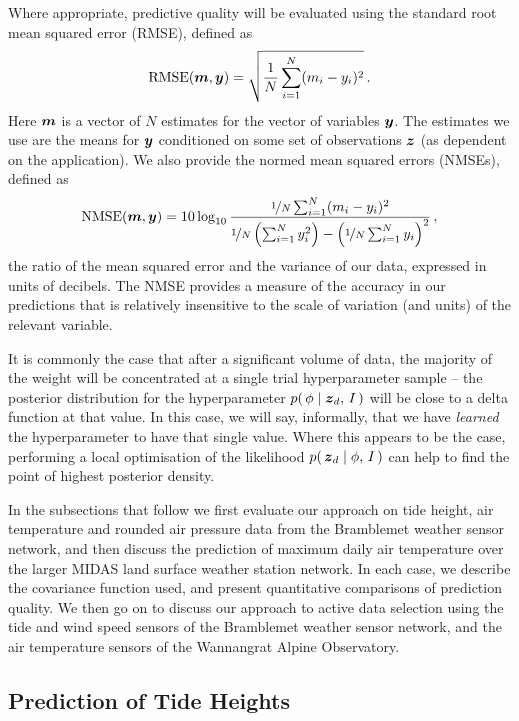 \documentclass{acmsmall}
\begin{document}
Where appropriate, predictive quality will be evaluated using the standard root mean squared error (RMSE), defined as
\begin{equation*}
 \text{RMSE}(\vect{m},\vy) = \sqrt{\frac{1}{N}\sum_{i=1}^N (m_i-y_i)^2}\,.
\end{equation*}
Here $\boldsymbol{m}$ is a vector of $N$ estimates for the vector of variables $\boldsymbol{y}$. The estimates we use are the means for $\boldsymbol{y}$ conditioned on some set of observations $\boldsymbol{z}$ (as dependent on the application). We also provide the normed mean squared errors (NMSEs), defined as
\begin{equation*}%
 \text{NMSE}(\vect{m},\vy) = 10 \log_{10} \frac{\nicefrac{1}{N} \sum_{i= 1}^{N} (m_i - y_i)^2 }{\nicefrac{1}{N} \left(\sum_{i = 1}^{N} y_i^2\right) - \left(\nicefrac{1}{N} \sum_{i = 1}^{N} y_i\right)^2 }\,,
\end{equation*}
the ratio of the mean squared error and the variance of our data, expressed in units of decibels. The NMSE provides a measure of the accuracy in our predictions that is relatively insensitive to the scale of variation (and units) of the relevant variable.

It is commonly the case that after a significant volume of data, the majority of the weight will be concentrated at a single trial hyperparameter sample -- the posterior distribution for the hyperparameter $p\!\left(\,\phi\mid\boldsymbol{z}_d,\,I\,\right)$ will be close to a delta function at that value. In this case, we will say, informally, that we have \emph{learned} the hyperparameter to have that single value. Where this appears to be the case, performing a local optimisation of the likelihood $p\!\left(\,\boldsymbol{z}_d\mid\phi,\,I\,\right)$ can help to find the point of highest posterior density.

In the subsections that follow we first evaluate our approach on tide height, air temperature and rounded air pressure data from the Bramblemet weather sensor network, and then discuss the prediction of maximum daily air temperature over the larger MIDAS land surface weather station network. In each case, we describe the covariance function used, and present quantitative comparisons of prediction quality. We then go on to discuss our approach to active data selection using the tide and wind speed sensors of the Bramblemet weather sensor network, and the air temperature sensors of the Wannangrat Alpine Observatory.

\subsection{Prediction of Tide Heights} \label{sec:tide_pred}
\end{document}
